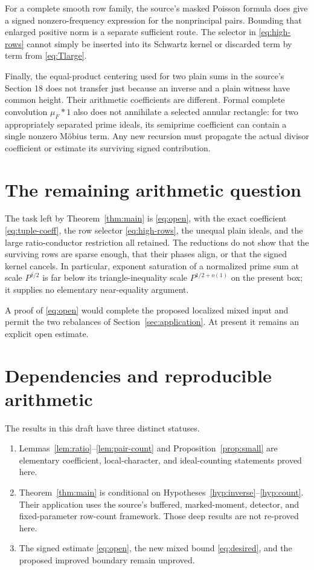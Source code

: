 \documentclass[11pt]{article}
\theoremstyle{definition}
\theoremstyle{remark}
\numberwithin{equation}{section}
\begin{document}
For a complete smooth row family, the source's masked Poisson
formula does give a signed nonzero-frequency expression for the
nonprincipal pairs. Bounding that enlarged positive norm is a
separate sufficient route. The selector in \eqref{eq:high-rows}
cannot simply be inserted into its Schwartz kernel or discarded
term by term from \eqref{eq:Tlarge}.

Finally, the equal-product centering used for two plain sums in
the source's Section 18 does not transfer just because an inverse
and a plain witness have common height. Their arithmetic coefficients
are different. Formal complete convolution $\mu_F*1$ also does not
annihilate a selected annular rectangle: for two appropriately
separated prime ideals, its semiprime coefficient can contain a
single nonzero M\"obius term. Any new recursion must propagate the
actual divisor coefficient or estimate its surviving signed
contribution.

\section{The remaining arithmetic question}

The task left by Theorem~\ref{thm:main} is \eqref{eq:open}, with
the exact coefficient \eqref{eq:tuple-coeff}, the row selector
\eqref{eq:high-rows}, the unequal plain ideals, and the large
ratio-conductor restriction all retained.
The reductions do not show that the surviving rows are sparse enough,
that their phases align, or that the signed kernel cancels.
In particular, exponent saturation of a normalized prime sum at
scale $P^{\delta/2}$ is far below its triangle-inequality scale
$P^{1/2+o(1)}$ on the present box; it supplies no elementary
near-equality argument.

A proof of \eqref{eq:open} would complete the proposed localized
mixed input and permit the two rebalances of
Section~\ref{sec:application}. At present it remains an explicit
open estimate.

\appendix
\section{Dependencies and reproducible arithmetic}\label{app:checks}

The results in this draft have three distinct statuses.
\begin{enumerate}
\item Lemmas~\ref{lem:ratio}--\ref{lem:pair-count} and
Proposition~\ref{prop:small} are elementary coefficient, local-character,
and ideal-counting statements proved here.
\item Theorem~\ref{thm:main} is conditional on
Hypotheses~\ref{hyp:inverse}--\ref{hyp:count}. Their application uses
the source's buffered, marked-moment, detector, and fixed-parameter
row-count framework. Those deep results are not re-proved here.
\item The signed estimate \eqref{eq:open}, the new mixed bound
\eqref{eq:desired}, and the proposed improved boundary remain unproved.
\end{enumerate}
\end{document}
